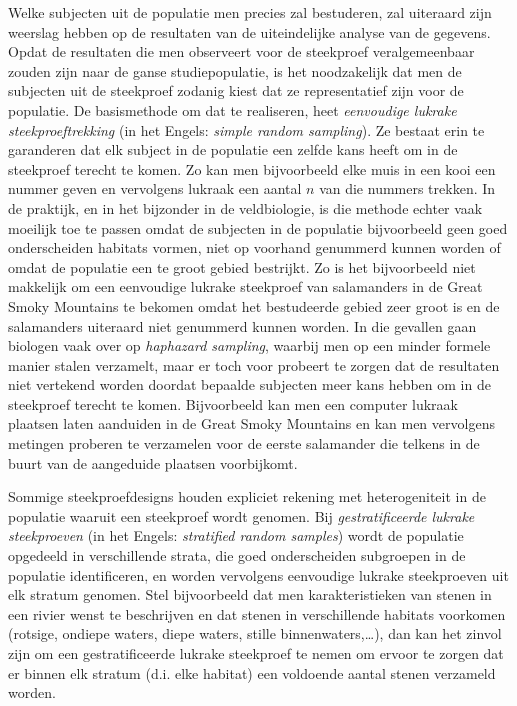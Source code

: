 \documentclass[
  12pt,dutch,coursenotes]{book}
\theoremstyle{definition}
\theoremstyle{definition}
\theoremstyle{definition}
\theoremstyle{remark}
\begin{document}
Welke subjecten uit de populatie men precies zal bestuderen, zal uiteraard zijn weerslag hebben op de resultaten van de uiteindelijke analyse van de gegevens. Opdat de resultaten die men observeert voor de steekproef veralgemeenbaar zouden zijn naar de ganse studiepopulatie, is het noodzakelijk dat men de subjecten uit de steekproef zodanig kiest dat ze representatief zijn voor de populatie. De basismethode om dat te realiseren, heet \emph{eenvoudige lukrake steekproeftrekking} (in het Engels: \emph{simple random sampling}). Ze bestaat erin te garanderen dat elk subject in de populatie een zelfde kans heeft om in de steekproef terecht te komen. Zo kan men bijvoorbeeld elke muis in een kooi een nummer geven en vervolgens lukraak een aantal \(n\) van die nummers trekken. In de praktijk, en in het bijzonder in de veldbiologie, is die methode echter vaak moeilijk toe te passen omdat de subjecten in de populatie bijvoorbeeld geen goed onderscheiden habitats vormen, niet op voorhand genummerd kunnen worden of omdat de populatie een te groot gebied bestrijkt. Zo is het bijvoorbeeld niet makkelijk om een eenvoudige lukrake steekproef van salamanders in de Great Smoky Mountains te bekomen omdat het bestudeerde gebied zeer groot is en de salamanders uiteraard niet genummerd kunnen worden. In die gevallen gaan biologen vaak over op \emph{haphazard sampling}, waarbij men op een minder formele manier stalen verzamelt, maar er toch voor probeert te zorgen dat de resultaten niet vertekend worden doordat bepaalde subjecten meer kans hebben om in de steekproef terecht te komen. Bijvoorbeeld kan men een computer lukraak plaatsen laten aanduiden in de Great Smoky Mountains en kan men vervolgens metingen proberen te verzamelen voor de eerste salamander die telkens in de buurt van de aangeduide plaatsen voorbijkomt.

Sommige steekproefdesigns houden expliciet rekening met heterogeniteit in de populatie waaruit een steekproef wordt genomen. Bij \emph{gestratificeerde lukrake steekproeven} (in het Engels: \emph{stratified random samples}) wordt de populatie opgedeeld in verschillende strata, die goed onderscheiden subgroepen in de populatie identificeren, en worden vervolgens eenvoudige lukrake steekproeven uit elk stratum genomen. Stel bijvoorbeeld dat men karakteristieken van stenen in een rivier wenst te beschrijven en dat stenen in verschillende habitats voorkomen (rotsige, ondiepe waters, diepe waters, stille binnenwaters,\ldots), dan kan het zinvol zijn om een gestratificeerde lukrake steekproef te nemen om ervoor te zorgen dat er binnen elk stratum (d.i. elke habitat) een voldoende aantal stenen verzameld worden.
\end{document}

